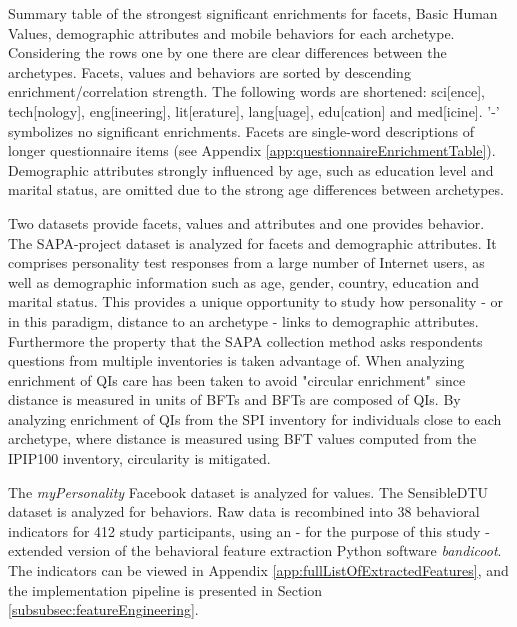 \begin{table}
	
	\caption{\label{tab:facetsValuesAttributesTable}Summary table of the strongest significant enrichments for facets, Basic Human Values, demographic attributes and mobile behaviors for each archetype. Considering the rows one by one there are clear differences between the archetypes. Facets, values and behaviors are sorted by descending enrichment/correlation strength. The following words are shortened: sci[ence], tech[nology], eng[ineering], lit[erature], lang[uage], edu[cation] and med[icine]. '-' symbolizes no significant enrichments. Facets are single-word descriptions of longer questionnaire items (see Appendix \ref{app:questionnaireEnrichmentTable}). Demographic attributes strongly influenced by age, such as education level and marital status, are omitted due to the strong age differences between archetypes.}
\end{table}

Two datasets provide facets, values and attributes and one provides behavior.
The SAPA-project dataset is analyzed for facets and demographic attributes.
It comprises personality test responses from a large number of Internet users, as well as demographic information such as age, gender, country, education and marital status.
This provides a unique opportunity to study how personality - or in this paradigm, distance to an archetype - links to demographic attributes.
Furthermore the property that the SAPA collection method asks respondents questions from multiple inventories is taken advantage of.
When analyzing enrichment of QIs care has been taken to avoid "circular enrichment" since distance is measured in units of BFTs and BFTs are composed of QIs.
By analyzing enrichment of QIs from the SPI inventory for individuals close to each archetype, where distance is measured using BFT values computed from the IPIP100 inventory, circularity is mitigated. 

The \textit{myPersonality} Facebook dataset is analyzed for values.
The SensibleDTU dataset is analyzed for behaviors.
Raw data is recombined into 38 behavioral indicators for 412 study participants, using an - for the purpose of this study - extended version of the behavioral feature extraction Python software \textit{bandicoot}. The indicators can be viewed in Appendix \ref{app:fullListOfExtractedFeatures}, and the implementation pipeline is presented in Section \ref{subsubsec:featureEngineering}.